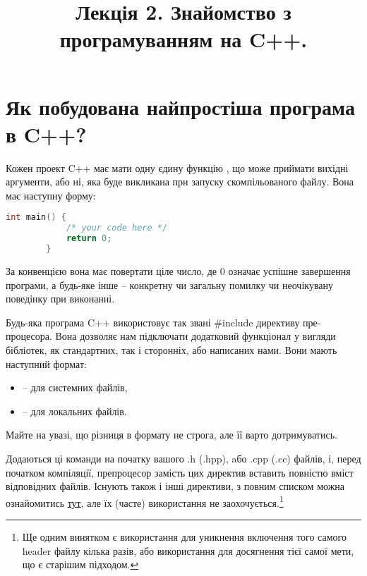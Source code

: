\documentclass[12pt]{article}
\title{Лекція 2. Знайомство з програмуванням на C++.}
\begin{document}
	\maketitle
	
	\tableofcontents
	
	\section{Як побудована найпростіша програма в C++?}
	Кожен проект C++ має мати одну єдину функцію , що може приймати вихідні аргументи, або ні, яка буде викликана при запуску скомпільованого файлу. Вона має наступну форму:
	\begin{lstlisting}[language=c++]
		int main() {
			/* your code here */
			return 0; 
		}
	\end{lstlisting}

	За конвенцією вона має повертати ціле число, де 0 означає успішне завершення програми, а будь-яке інше -- конкретну чи загальну помилку чи неочікувану поведінку при виконанні.

	Будь-яка програма C++ використовує так звані \#include директиву пре-процесора. Вона дозволяє нам підключати додатковий функціонал у вигляди бібліотек, як стандартних, так і сторонніх, або написаних нами. Вони мають наступний формат:
	\begin{itemize}
		\item {} -- для системних файлів,
		\item {} -- для локальних файлів.
	\end{itemize}
	Майте на увазі, що різниця в формату не строга, але її варто дотримуватись.

	Додаються ці команди на початку вашого .h (.hpp), aбо .cpp (.cc) файлів, і, перед початком компіляції, препроцесор замість цих директив вставить повністю вміст відповідних файлів. Існують також і інші директиви, з повним списком можна ознайомитись \href{https://en.cppreference.com/w/cpp/preprocessor}{тут}, але їх (часте) використання не заохочується.\footnote{Ще одним винятком є використання  для уникнення включення того самого header файлу кілька разів, або використання  для досягнення тієї самої мети, що є старішим підходом.}
\end{document}
